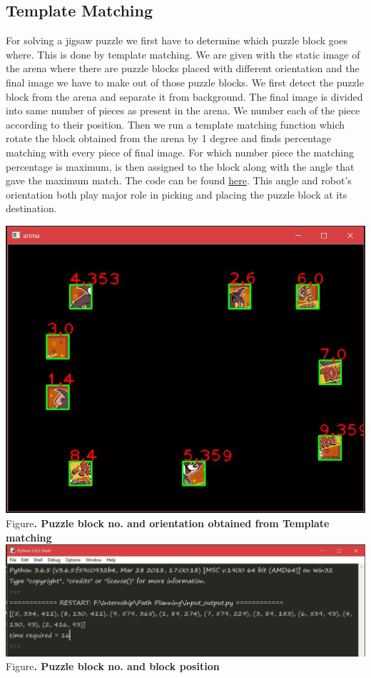 \documentclass[a4paper,12pt,oneside]{book}
\begin{document}
\subsection*{Template Matching}
For solving a jigsaw puzzle we first have to determine which puzzle block goes where. This is done by template matching. We are given with the static image of the arena where there are puzzle blocks placed with different orientation and the final image we have to make out of those puzzle blocks. We first detect the puzzle block from the arena and separate it from background. The final image is divided into same number of pieces as present in the arena. We number each of the piece according to their position. Then we run a template matching function which rotate the block obtained from the arena by 1 degree and finds percentage matching with every piece of final image. For which number piece the matching percentage is maximum, is then
assigned to the block along with the angle that gave the maximum match. The code can be found \href{https://github.com/eYSIP-2018/Jigsaw_Puzzle_Solver_using_Multiple_Robots/blob/master/Scripts/arena and puzzle block detection/input_output.py}{here}. This angle and robot's orientation both play major role in picking and placing the puzzle block at its destination.
\begin{center}
\includegraphics[scale = 0.4]{template.jpg}\\
\small{Figure\textbf{. Puzzle block no. and orientation obtained from Template matching}}\\
\includegraphics[scale = 0.32]{templatem.jpg}\\
\small{Figure\textbf{. Puzzle block no. and block position}}\\
\end{center}
\end{document}
